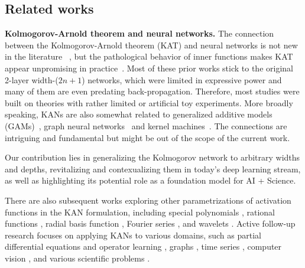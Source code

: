 \documentclass[12pt]{caltech_thesis}
\numberwithin{equation}{section}
\begin{document}
\subsection{Related works}\label{app:related_works}

\textbf{Kolmogorov-Arnold theorem and neural networks.} The connection between the Kolmogorov-Arnold theorem (KAT) and neural networks is not new in the literature ~\cite{poggio2022deep,schmidt2021kolmogorov,sprecher2002space,koppen2002training,lin1993realization,lai2021kolmogorov,leni2013kolmogorov,fakhoury2022exsplinet,ismayilova2024kolmogorov,poluektov2023new}, but the pathological behavior of inner functions makes KAT appear unpromising in practice~\cite{poggio2022deep}. Most of these prior works stick to the original 2-layer width-($2n+1$) networks, which were limited in expressive power and many of them are even predating back-propagation. Therefore, most studies were built on theories with rather limited or artificial toy experiments. More broadly speaking, KANs are also somewhat related to generalized additive models (GAMs)~\cite{agarwal2021neural}, graph neural networks~\cite{zaheer2017deep} and kernel machines~\cite{song2018optimizing}. The connections are intriguing and fundamental but might be out of the scope of the current work.

Our contribution lies in generalizing the Kolmogorov network to arbitrary widths and depths, revitalizing and contexualizing them in today's deep learning stream, as well as highlighting its potential role as a foundation model for AI + Science.  

There are also subsequent works exploring other parametrizations of activation functions in the KAN formulation, including special polynomials \cite{aghaei2024fkan, seydi2024exploring, ss2024chebyshev}, rational functions \cite{aghaei2024rkan}, radial basis function \cite{li2024kolmogorov,ta2024bsrbf}, Fourier series \cite{xu2024fourierkan}, and wavelets \cite{bozorgasl2024wav,seydi2024unveiling}. Active follow-up research focuses on applying KANs to various domains, such as partial differential equations \cite{wang2024kolmogorov,shukla2024comprehensive, rigas2024adaptive} and operator learning \cite{abueidda2024deepokan,shukla2024comprehensive,nehma2024leveraging}, graphs \cite{bresson2024kagnns,de2024kolmogorov,kiamari2024gkan,zhang2024graphkan}, time series \cite{vaca2024kolmogorov,genet2024tkan,xu2024kolmogorov,genet2024temporal}, computer vision \cite{cheon2024kolmogorov,azam2024suitability,li2024u,cheon2024demonstrating,seydi2024unveiling,bodner2024convolutional}, and various scientific problems \cite{liu2024ikan,liu2024initial,yang2024endowing,herbozo2024kan,kundu2024kanqas, li2024coeff,ahmed24graphkan,liu2024complexityclaritykolmogorovarnoldnetworks,peng2024predictive,pratyush2024calmphoskan}. 
\end{document}
